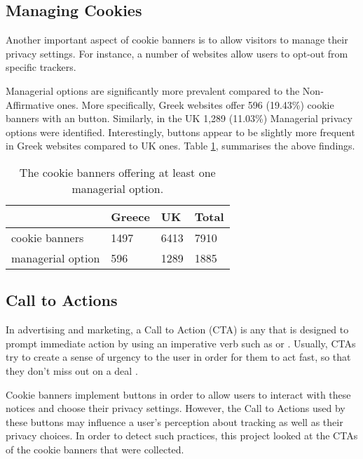 \documentclass[../main.tex]{subfiles}
\begin{document}
\subsection{Managing Cookies}
Another important aspect of cookie banners is to allow visitors to manage their privacy settings. For instance, a number of websites allow users to opt-out from specific trackers. 

Managerial options are significantly more prevalent compared to the Non-Affirmative ones. More specifically, Greek websites offer 596 (19.43\%) cookie banners with an  button. Similarly, in the UK 1,289 (11.03\%) Managerial privacy options were identified. Interestingly,  buttons appear to be slightly more frequent in Greek websites compared to UK ones. Table \ref{tab:managerial_options}, summarises the above findings.

\begin{table}[ht]
    \centering
    \begin{tabular}{@{}llll@{}}
        \toprule
                        & Greece & UK   & Total \\ \midrule
        cookie banners    & 1497   & 6413 & 7910  \\
        managerial option & 596    & 1289 & 1885  \\ \bottomrule
    \end{tabular}
    \caption{The cookie banners offering at least one managerial option.}
    \label{tab:managerial_options}
\end{table}

\subsection{Call to Actions}
In advertising and marketing, a Call to Action (CTA) is any  that is designed to prompt immediate action by using an imperative verb such as  or  \cite{eisenberg2006call}. Usually, CTAs try to create a sense of urgency to the user in order for them to act fast, so that they don’t miss out on a deal \cite{hornor_2012}.

Cookie banners implement buttons in order to allow users to interact with these notices and choose their privacy settings. However, the Call to Actions used by these buttons may influence a user’s perception about tracking as well as their privacy choices. In order to detect such practices, this project looked at the CTAs of the cookie banners that were collected.
\end{document}
